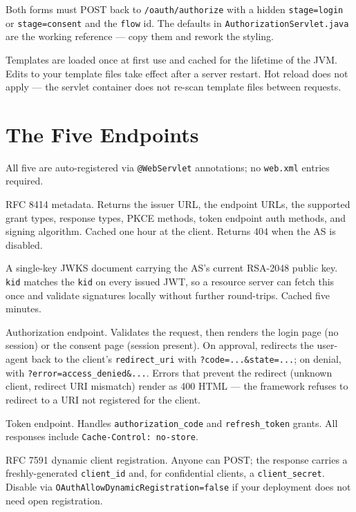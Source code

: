 Both forms must POST back to \texttt{/oauth/authorize} with a hidden \texttt{stage=login} or \texttt{stage=consent} and the \texttt{flow} id.  The defaults in \texttt{AuthorizationServlet.java} are the working reference --- copy them and rework the styling.

\begin{notebox}
Templates are loaded once at first use and cached for the lifetime of the JVM.  Edits to your template files take effect after a server restart.  Hot reload does not apply --- the servlet container does not re-scan template files between requests.
\end{notebox}

\section{The Five Endpoints}
\label{sec:as-endpoints}

All five are auto-registered via \texttt{@WebServlet} annotations; no \texttt{web.xml} entries required.

\begin{description}[style=nextline]
  \item[\texttt{GET /.well-known/oauth-authorization-server}]  RFC 8414 metadata.  Returns the issuer URL, the endpoint URLs, the supported grant types, response types, PKCE methods, token endpoint auth methods, and signing algorithm.  Cached one hour at the client.  Returns 404 when the AS is disabled.
  \item[\texttt{GET /oauth/jwks}]  A single-key JWKS document carrying the AS's current RSA-2048 public key.  \texttt{kid} matches the \texttt{kid} on every issued JWT, so a resource server can fetch this once and validate signatures locally without further round-trips.  Cached five minutes.
  \item[\texttt{GET /oauth/authorize}]  Authorization endpoint.  Validates the request, then renders the login page (no session) or the consent page (session present).  On approval, redirects the user-agent back to the client's \texttt{redirect\_uri} with \texttt{?code=...\&state=...}; on denial, with \texttt{?error=access\_denied\&...}.  Errors that prevent the redirect (unknown client, redirect URI mismatch) render as 400 HTML --- the framework refuses to redirect to a URI not registered for the client.
  \item[\texttt{POST /oauth/token}]  Token endpoint.  Handles \texttt{authorization\_code} and \texttt{refresh\_token} grants.  All responses include \texttt{Cache-Control: no-store}.
  \item[\texttt{POST /oauth/register}]  RFC 7591 dynamic client registration.  Anyone can POST; the response carries a freshly-generated \texttt{client\_id} and, for confidential clients, a \texttt{client\_secret}.  Disable via \texttt{OAuthAllowDynamic\-Registration=false} if your deployment does not need open registration.
\end{description}

